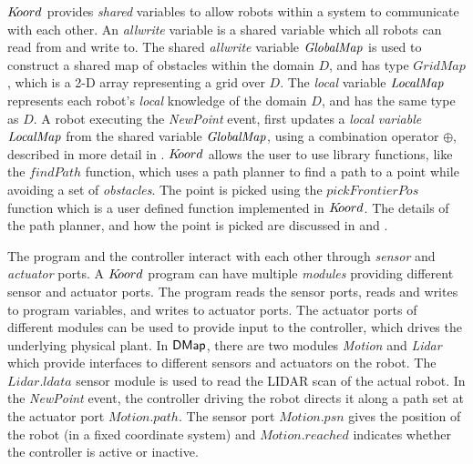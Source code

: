 $K\kern-2pt oord$ provides \emph{shared} variables to allow robots within a system to communicate with each other. An \emph{allwrite} variable is a shared variable which all robots can read from and write to. The shared \emph{allwrite} variable $\mathit{GlobalMap}$ is used to construct a shared map of obstacles within the domain $D$, and has type $\mathit{GridMap}$, which is a 2-D array representing a grid over $D$. The \emph{local} variable $\mathit{LocalMap}$ represents each robot's \emph{local} knowledge of the domain $D$, and has the same type as $D$. A robot executing the \emph{NewPoint} event, first updates a \emph{local variable} $\mathit{LocalMap}$ from the shared variable $\mathit{GlobalMap}$, using a combination operator $\oplus$, described in more detail in . $K\kern-2pt oord$ allows the user to use library functions, like the $\mathit{findPath}$ function, which uses a path planner to find a path to a point while avoiding a set of \emph{obstacles}. The point is picked using the $\mathit{pickFrontierPos}$ function which is a user defined function implemented in $K\kern-2pt oord$. The details of the path planner, and how the point is picked are discussed in and  .




 The program and the controller interact with each other through \emph{sensor} and \emph{actuator} ports. A $K\kern-2pt oord$ program can have multiple \emph{modules} providing different sensor and actuator ports. The program reads the sensor ports, reads and writes to program variables, and writes to actuator ports. The actuator ports of different modules can be used to provide input to the controller, which drives the underlying physical plant. In ${\sf DMap}$, there are two modules \emph{Motion} and \emph{Lidar} which provide interfaces to different sensors and actuators on the robot. The $\mathit{Lidar.ldata}$ sensor module is used to read the LIDAR scan of the actual robot. In the \emph{NewPoint} event, the controller driving the robot directs it along a path set at the actuator port $\mathit{Motion.path}$. The sensor port $\mathit{Motion.psn}$ gives the position of the robot (in a fixed coordinate system) and $\mathit{Motion.reached}$ indicates whether the controller is active or inactive.

